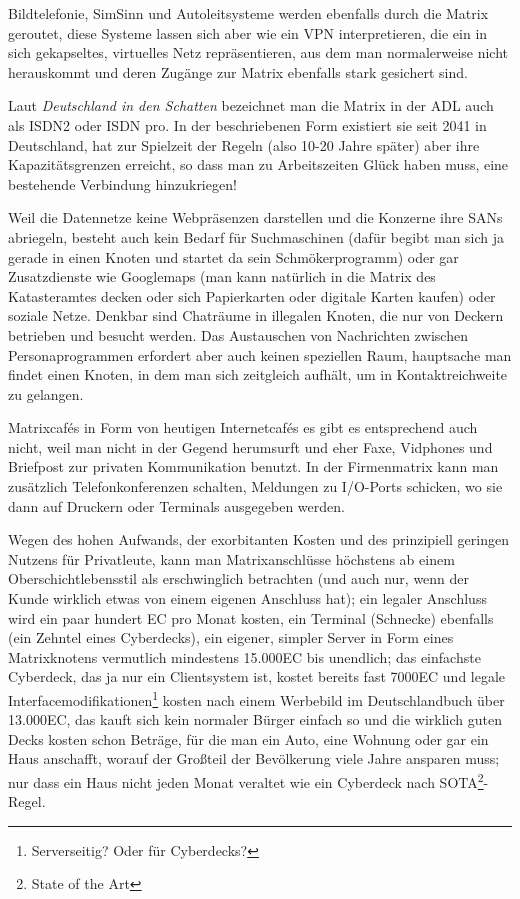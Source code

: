 \documentclass[a4paper]{scrartcl}
\begin{document}
Bildtelefonie, SimSinn und Autoleitsysteme werden ebenfalls durch die Matrix geroutet, diese Systeme lassen sich aber 
wie ein VPN interpretieren, die ein in sich gekapseltes, virtuelles Netz repräsentieren, aus dem man normalerweise nicht
herauskommt und deren Zugänge zur Matrix ebenfalls stark gesichert sind.

Laut \textit{Deutschland in den Schatten} bezeichnet man die Matrix in der ADL auch als ISDN2 oder ISDN pro.
In der beschriebenen Form existiert sie seit 2041 in Deutschland, hat zur Spielzeit der Regeln (also 10-20 Jahre später) 
aber ihre Kapazitätsgrenzen erreicht, so dass man zu Arbeitszeiten Glück haben muss, eine bestehende Verbindung hinzukriegen!

Weil die Datennetze keine Webpräsenzen darstellen und die Konzerne ihre SANs abriegeln, besteht auch kein Bedarf für
Suchmaschinen (dafür begibt man sich ja gerade in einen Knoten und startet da sein Schmökerprogramm)
oder gar Zusatzdienste wie Googlemaps (man kann natürlich in die Matrix des Katasteramtes decken oder sich Papierkarten oder
digitale Karten kaufen) oder soziale Netze.
Denkbar sind Chaträume in illegalen Knoten, die nur von Deckern betrieben und besucht werden.
Das Austauschen von Nachrichten zwischen Personaprogrammen erfordert aber auch keinen speziellen Raum, hauptsache man
findet einen Knoten, in dem man sich zeitgleich aufhält, um in Kontaktreichweite zu gelangen.

Matrixcafés in Form von heutigen Internetcafés es gibt es entsprechend auch nicht, weil man nicht in der Gegend herumsurft
und eher Faxe, Vidphones und Briefpost zur privaten Kommunikation benutzt.
In der Firmenmatrix kann man zusätzlich Telefonkonferenzen schalten, Meldungen zu I/O-Ports schicken, wo sie dann auf
Druckern oder Terminals ausgegeben werden.

Wegen des hohen Aufwands, der exorbitanten Kosten und des prinzipiell geringen Nutzens für Privatleute, kann man
Matrixanschlüsse höchstens ab einem Oberschichtlebensstil als erschwinglich betrachten (und auch nur, wenn der
Kunde wirklich etwas von einem eigenen Anschluss hat); ein legaler Anschluss wird ein paar hundert EC pro Monat kosten, ein
Terminal (Schnecke) ebenfalls (ein Zehntel eines Cyberdecks), ein eigener, simpler Server in Form eines Matrixknotens
vermutlich mindestens 15.000EC bis unendlich; das einfachste Cyberdeck, das ja nur ein Clientsystem ist, kostet bereits fast
7000EC und legale Interfacemodifikationen\footnote{Serverseitig? Oder für Cyberdecks?} kosten nach einem Werbebild im
Deutschlandbuch über 13.000EC, das kauft sich kein normaler Bürger einfach so und die wirklich guten Decks
kosten schon Beträge, für die man ein Auto, eine Wohnung oder gar ein Haus anschafft, worauf der Großteil der Bevölkerung
viele Jahre ansparen muss; nur dass ein Haus nicht jeden Monat veraltet wie ein Cyberdeck nach SOTA\footnote{State of the Art}-Regel.
\end{document}
